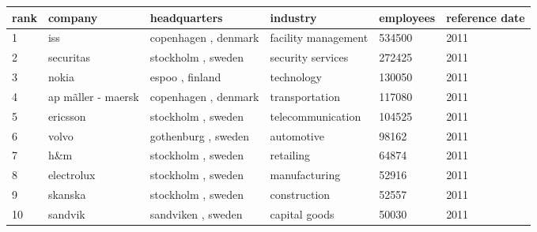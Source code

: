 \documentclass{article}
\begin{document}
\begin{tabular}{llllll}
\toprule
rank & company & headquarters & industry & employees & reference date \\
\midrule
1 & iss & copenhagen , denmark & facility management & 534500 & 2011 \\
2 & securitas & stockholm , sweden & security services & 272425 & 2011 \\
3 & nokia & espoo , finland & technology & 130050 & 2011 \\
4 & ap mãller - maersk & copenhagen , denmark & transportation & 117080 & 2011 \\
5 & ericsson & stockholm , sweden & telecommunication & 104525 & 2011 \\
6 & volvo & gothenburg , sweden & automotive & 98162 & 2011 \\
7 & h\&m & stockholm , sweden & retailing & 64874 & 2011 \\
8 & electrolux & stockholm , sweden & manufacturing & 52916 & 2011 \\
9 & skanska & stockholm , sweden & construction & 52557 & 2011 \\
10 & sandvik & sandviken , sweden & capital goods & 50030 & 2011 \\
\bottomrule
\end{tabular}
\end{document}
